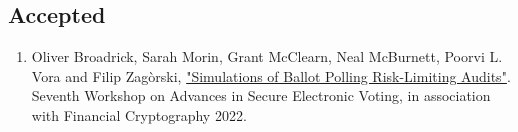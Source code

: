 \documentclass[letterpaper]{article}
\begin{document}
\subsection*{Accepted}
\begin{enumerate}
\item Oliver Broadrick, Sarah Morin, Grant McClearn, Neal McBurnett, Poorvi L. Vora and Filip Zag\`{o}rski, \href{https://oliverbroadrick.com/papers/simulations-of-ballot-polling-rlas.pdf}{"Simulations of Ballot Polling Risk-Limiting Audits"}. Seventh Workshop on Advances in Secure Electronic Voting, in association with Financial Cryptography 2022.
\end{enumerate}

\bigskip
\end{document}
